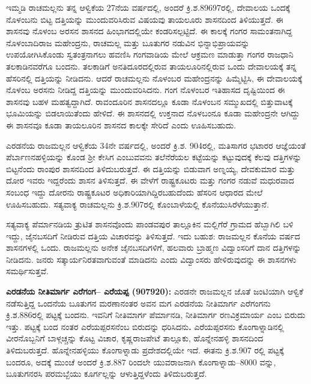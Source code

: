 ಇಮ್ಮಡಿ ರಾಚಮಲ್ಲನು ತನ್ನ ಆಳ್ವಿಕೆಯ 27ನೆಯ ವರ್ಷದಲ್ಲಿ, ಅಂದರೆ ಕ್ರಿ.ಶ.89697ರಲ್ಲಿ, ದೇವಾಲಯ ಒಂದಕ್ಕೆ ನೊಳಂಬನು ಬಿಟ್ಟ ದತ್ತಿಯನ್ನು ಮುಂದುವರಿಸಿರುವ ವಿಷಯವು ತಾಯಲೂರು ಶಾಸನದಿಂದ ತಿಳಿಯುತ್ತದೆ. ಈ ಶಾಸನವು ನೊಳಂಬ ಅರಸನ ಶಾಸನದ ಹಿಂಭಾಗದಲ್ಲಿಯೇ ಕಂಡರಿಸಲ್ಪಟ್ಟಿದೆ. ಈ ಕಾಲಕ್ಕೆ ಗಂಗರ ಸಾಮಂತನಾಗಿದ್ದ ನೊಳಂಬಾದಿರಾಜ ಮಹೇಂದ್ರನು, ರಾಚಮಲ್ಲ ಮತ್ತು ಬೂತುಗರ ನಡುವಿನ ಭಿನ್ನಾಭಿಪ್ರಾಯವನ್ನು ಉಪಯೋಗಿಸಿಕೊಂಡು ಸ್ವತಂತ್ರನಾಗಲು ಹವಣಿಸಿ ಗಂಗವಾಡಿಯ ಮೇಲೆ ಆಕ್ರಮಣ ಮಾಡುತ್ತಾ ಗಂಗರ ರಾಜಧಾನಿ ತಲಕಾಡಿನವರೆಗೂ ಬಂದನು. ತಲಕಾಡಿಗೆ ಅನತಿದೂರದಲ್ಲಿರುವ ತಾಯಲೂರಿನಲ್ಲಿರುವ ಒಂದು ದೇವಾಲಯಕ್ಕೆ ತನ್ನ ಹೆಸರಿನಲ್ಲಿ ದತ್ತಿಯನ್ನು ನೀಡಿದನು. ಆದರೆ ರಾಚಮಲ್ಲನು ನೊಳಂಬರ ಮಹೇಂದ್ರನನ್ನು ಹಿಮ್ಮೆಟ್ಟಿಸಿ, ಈ ದೇವಾಲಯಕ್ಕೆ ನೊಳಂಬ ಅರಸನು ನೀಡಿದ್ದ ದತ್ತಿಯನ್ನು ಮುಂದುವರಿಸಿದನು. ಗಂಗ ನೊಳಂಬರ ಇತಿಹಾಸದ ದೃಷ್ಟಿಯಿಂದ ಈ ಶಾಸನವು ಬಹಳ ಮಹತ್ವದ್ದಾಗಿದೆ. ರಾವಂದೂರಿನ ಶಾಸನದಲ್ಲೂ ಕೂಡಾ ನೊಳಂಬನ ಸಮ್ಮುಖದಲ್ಲಿ ಬಿತ್ತುವಾಟಕ್ಕೆ ಭೂಮಿಯನ್ನು ಬಿಡಲಾಯಿತೆಂದು ಹೇಳಿದೆ. ಈ ಶಾಸನದಲ್ಲಿ ಉಕ್ತನಾದ ನೊಳಬಂನೂ ಕೂಡಾ ಮಹೇಂದ್ರನೇ ಆಗಿದ್ದು ಈ ಶಾಸನವೂ ಕೂಡಾ ತಾಯಲೂರಿನ ಶಾಸನದ ಕಾಲಕ್ಕೇ ಸೇರಿದೆ ಎಂದು ಊಹಿಸಬಹುದು.

ಎರಡನೆಯ ರಾಜಮಲ್ಲನ ಆಳ್ವಿಕೆಯ 34ನೇ ವರ್ಷದಲ್ಲಿ, ಅಂದರೆ ಕ್ರಿ.ಶ. 904ರಲ್ಲಿ, ಮತಿಸಾಗರ ಭಟಾರರ ಆಜ್ಞೆಯಂತೆ ಪೆರ್ಬಾಣನಹಳ್ಳಿಯನ್ನು ಕೊಂಡ ಶ‍್ರೀ ಕೇಸಿಗ ಎಂಬುವವನು ತಲೆನೆರೆಯಲ ಕಟ್ಟೆಯನ್ನು ಕಟ್ಟುವುದಕ್ಕೆ ಕೆಲವು ದತ್ತಿಗಳನ್ನು ಬಿಟ್ಟನೆಂದು ರಾಂಪುರ ಶಾಸನದಿಂದ ತಿಳಿದುಬರುತ್ತದೆ. ಈ ದತ್ತಿಯನ್ನು ಬಿಡುವಾಗ ಅಣ್ನಯ್ಯ, ದೇವಕುಮಾರ ಮತ್ತು ದೋರ ಇವರು ಇದ್ದರೆಂದು ಶಾಸನ ತಿಳಿಸುತ್ತದೆ. ಈ ವೇಳೆಗೆ ರಾಷ್ಟ್ರಕೂಟರು ಮತ್ತು ಗಂಗರ ನಡುವೆ ಮಧುರವಾದ ಸಂಬಂಧ ಇದ್ದು ದೋರನು ರಾಷ್ಟ್ರಕೂಟರ ಅಧಿಕಾರಿಯಾಗಿದ್ದಿರಬಹುದೆಂದು ಹೆಸರಿನ ಆಧಾರದ ಮೇಲೆ ಊಹಿಸಬಹುದು. ಸತ್ಯವಾಕ್ಯ ರಾಚಮಲ್ಲನು ಕ್ರಿ.ಶ.907ರಲ್ಲಿ ಕೊಂಬಾಳೆಯಲ್ಲಿ ಕೊನೆಯುಸಿರೆಳೆಯುತ್ತಾನೆ.

ಸತ್ಯವಾಕ್ಯ ಪೆರ್ಮಾನಡಿಯ ತ್ರುಟಿತ ಶಾಸನವೊಂದು ಪಾಂಡವಪುರ ತಾಲ್ಲೂಕಿನ ಮಲ್ಲಿಗೆರೆ ಗ್ರಾಮದ ಹೆಬ್ಬಾಗಿಲಿ ಬಳಿ ಇದ್ದು, ಜೈನಬಸದಿಗೆ ನೀಡಿರುವ ದತ್ತಿಯ ವಿಚಾರವನ್ನು ತಿಳಿಸುತ್ತದೆ. ಇದು ಬಹುಶ: ರಾಜಮಲ್ಲನ ಕೊನೆಯ ವರ್ಷದ ಶಾಸನಗಳಲ್ಲಿ ಒಂದು. ರಾಜಮಲ್ಲನು ಅನೇಕ ಜೈನಬಸದಿಗಳಿಗೆ, ಹಲವಾರು ಬ್ರಾಹ್ಮಣ ವಿದ್ವಾಂಸರಿಗೆ ದಾನ ದತ್ತಿಗಳನ್ನು ನೀಡಿದನು. ಜನರು ಸತ್ಕಾರ್ಯನಿರತವಾಗುವಂತೆ ಮಾಡಿದನು ಎಂದು ವಿದ್ವಾಂಸರು ಹೇಳಿರುವುದನ್ನು ಈ ಶಾಸನಗಳು ಸಮರ್ಥಿಸುತ್ತವೆ.

\textbf{ಎರಡನೆಯ ನೀತಿಮಾರ್ಗ ಎರೆಗಂಗ– ಎರೆಯಪ್ಪ (907920): } ಎರಡನೇ ರಾಜಮಲ್ಲನ ಜೊತೆ ಜಂಟಿಯಾಗಿ ಆಳ್ವಿಕೆ ನಡೆಸುತ್ತಿದ್ದ ಒಂದನೆಯ ಬೂತುಗನ ಮರಣಾನಂತರ ಅವನ ಮಗ ಎರಡನೆಯ ನೀತಿಮಾರ್ಗ ಎರೆಗಂಗನು ಕ್ರಿ.ಶ.886ರಲ್ಲಿ ಪಟ್ಟಕ್ಕೆ ಬಂದನು. ಇವನಿಗೆ ನೀತಿಮಾರ್ಗ ಪೆರ್ಮಾನಡಿ, ನೀತಿಮಾರ್ಗ ರಣವಿಕ್ರಮಾರ್ಯ ಎಂಬ ಬಿರುದು ಇತ್ತು. ಪಟ್ಟಕ್ಕೆ ಬಂದ ನಂತರ ಎರೆಯಪ್ಪರಸನೆಂಬ ಬಿರುದನ್ನು ಧರಿಸಿದನು\textbf{. }ಎರೆಯಪ್ಪರಸನು ಕೊಂಗಾಳ್ನಾಡಿನಲ್ಲಿ ವೀರನೊಬ್ಬನಿಗೆ ಬಾಳ್ಗಚ್ಚನ್ನು ಕೊಟ್ಟ ವಿಚಾರ, ಕೃಷ್ಣರಾಜಪೇಟೆ ತಾಲ್ಲೂಕು, ಹೊನ್ನೇನಹಳ್ಳಿ ಶಾಸನದಿಂದ ತಿಳಿದುಬರುತ್ತದೆ. ಹೊನ್ನೇನಹಳ್ಳಿಯು ಕೊಂಗಾಳ್ನಾಡು ಪ್ರದೇಶದಲ್ಲಿಯೇ ಇದೆ. ಈತನು ಕ್ರಿ.ಶ.907 ರಲ್ಲಿ ಪಟ್ಟಕ್ಕೆ ಬಂದರೂ, ಅದಕ್ಕೆ ಮುಂಚೆ ಅಂದರೆ ಕ್ರಿ.ಶ.887 ರಿಂದಲೇ ಯುವರಾಜನಾಗಿ ಕೊಂಗಾಳ್ನಾಡು–8000 ವನ್ನು, ಬೂತುಗನರಸಿ ಪರಮಬ್ಬೆಯು ಕೂರ್ಗಲ್ಲನ್ನು ಆಳುತ್ತಿದ್ದಳೆಂದು ತಿಳಿದುಬರುತ್ತದೆ.

